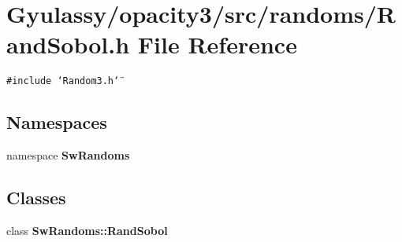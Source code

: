 \section{Gyulassy/opacity3/src/randoms/RandSobol.h File Reference}
\label{RandSobol_8h}
{\tt \#include \char`\"{}Random3.h\char`\"{}}\par
\subsection*{Namespaces}
\begin{CompactItemize}
\item 
namespace {\bf SwRandoms}
\end{CompactItemize}
\subsection*{Classes}
\begin{CompactItemize}
\item 
class {\bf SwRandoms::RandSobol}
\end{CompactItemize}
